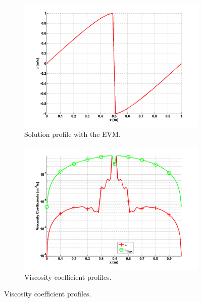 \begin{figure}[H]
        \begin{subfigure}[b]{0.495\textwidth}
                \centering
                \includegraphics[width=\textwidth]{figures/1D_sol_ev.png}
                \caption{Solution profile with the EVM.}
                \label{fig:1d_burger_ev}
        \end{subfigure}
%       
        \begin{subfigure}[b]{0.495\textwidth}
                \centering
                \includegraphics[width=\textwidth]{figures/1D_visc.png}
                \caption{Viscosity coefficient profiles.}
                \label{fig:1d_burger_visc}
        \end{subfigure}
\end{figure}
%
